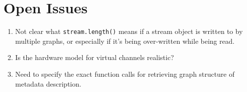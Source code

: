 \section{Open Issues}

\begin{enumerate}

\item Not clear what {\tt stream.length()} means if a stream object is
written to by multiple graphs, or especially if it's being
over-written while being read.

\item Is the hardware model for virtual channels realistic?

\item Need to specify the exact function calls for retrieving graph
structure of metadata description.

\end{enumerate}